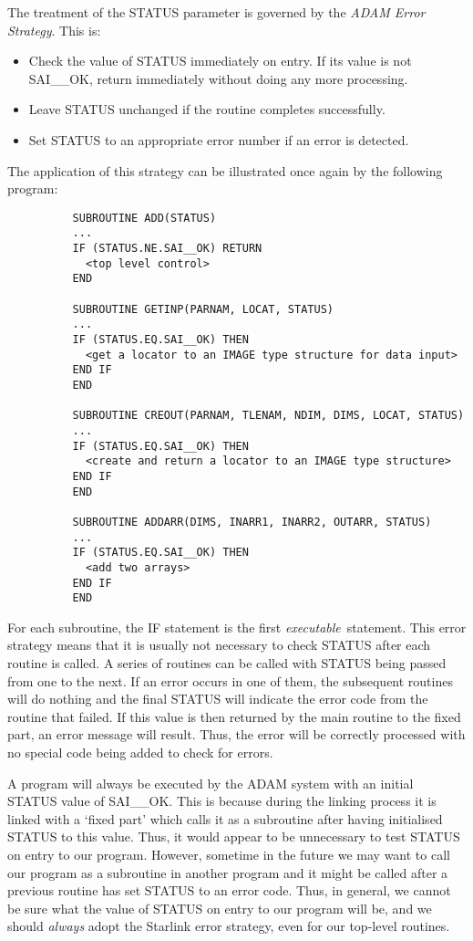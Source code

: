 The treatment of the STATUS parameter is governed by the {\em ADAM Error
Strategy}.
This is:
\begin{itemize}
\item Check the value of STATUS immediately on entry.
 If its value is not SAI\_\_OK, return immediately without doing any more
 processing.
\item Leave STATUS unchanged if the routine completes successfully.
\item Set STATUS to an appropriate error number if an error is detected.
\end{itemize}
The application of this strategy can be illustrated once again by the following
program:

\begin{small}
\begin{verbatim}
          SUBROUTINE ADD(STATUS)
          ...
          IF (STATUS.NE.SAI__OK) RETURN
            <top level control>
          END

          SUBROUTINE GETINP(PARNAM, LOCAT, STATUS)
          ...
          IF (STATUS.EQ.SAI__OK) THEN
            <get a locator to an IMAGE type structure for data input>
          END IF
          END

          SUBROUTINE CREOUT(PARNAM, TLENAM, NDIM, DIMS, LOCAT, STATUS)
          ...
          IF (STATUS.EQ.SAI__OK) THEN
            <create and return a locator to an IMAGE type structure>
          END IF
          END

          SUBROUTINE ADDARR(DIMS, INARR1, INARR2, OUTARR, STATUS)
          ...
          IF (STATUS.EQ.SAI__OK) THEN
            <add two arrays>
          END IF
          END
\end{verbatim}
\end{small}

For each subroutine, the IF statement is the first {\em executable}\, statement.
This error strategy means that it is usually not necessary to check STATUS after
each routine is called.
A series of routines can be called with STATUS being passed from one to the
next.
If an error occurs in one of them, the subsequent routines will do nothing and
the final STATUS will indicate the error code from the routine that failed.
If this value is then returned by the main routine to the fixed part, an error
message will result.
Thus, the error will be correctly processed with no special code being added to
check for errors.

A program will always be executed by the ADAM system with an initial STATUS
value of SAI\_\_OK.
This is because during the linking process it is linked with a `fixed part'
which calls it as a subroutine after having initialised STATUS to this value.
Thus, it would appear to be unnecessary to test STATUS on entry to our program.
However, sometime in the future we may want to call our program as a subroutine
in another program and it might be called after a previous routine has set
STATUS to an error code.
Thus, in general, we cannot be sure what the value of STATUS on entry to our
program will be, and we should {\em always} adopt the Starlink error strategy,
even for our top-level routines.

